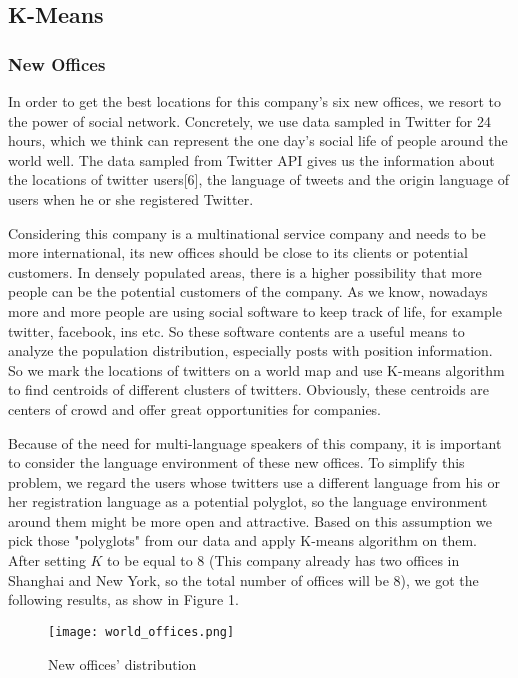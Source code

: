 \documentclass{mcmthesis}
\begin{document}
    \subsection{K-Means}
  
    \subsubsection{New Offices}
  
    \indent \indent In order to get the best locations for this company's six new offices, we resort to the power of social network. Concretely, we use data sampled in Twitter for 24 hours, which we think can represent the one day's social life of people around the world well. The data sampled from Twitter API gives us the information about the locations of twitter users[6], the language of tweets and the origin language of users when he or she registered Twitter. 
  
    \indent Considering this company is a multinational service company and needs to be more international, its new offices should be close to its clients or potential customers. In densely populated areas, there is a higher possibility that more people can be the potential customers of the company. As we know, nowadays more and more people are using social software to keep track of life, for example twitter, facebook, ins etc. So these software contents are a useful means to analyze the population distribution, especially posts with position information. So we mark the locations of twitters on a world map and use K-means algorithm to find centroids of different clusters of twitters. Obviously, these centroids are centers of crowd and offer great opportunities for companies.
    
    \indent Because of the need for multi-language speakers of this company, it is important to consider the language environment of these new offices. To simplify this problem, we regard the users whose twitters use a different language from his or her registration language as a potential polyglot, so the language environment around them might be more open and attractive. Based on this assumption we pick those "polyglots" from our data and apply K-means algorithm on them. After setting $K$ to be equal to 8 (This company already has two offices in Shanghai and New York, so the total number of offices will be 8), we got the following results, as show in Figure 1. 
  
    \begin{figure}[h]
      \small
      \centering
      \texttt{[image: world\_offices.png]}
      \caption{New offices' distribution} 
    \end{figure}
    \newpage
  
\end{document}
